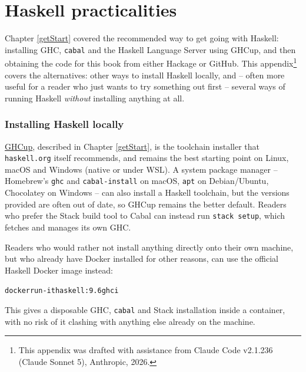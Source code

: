

\chapter{Haskell practicalities}
\label{OtherHS}

Chapter \ref{getStart} covered the recommended way to get going with Haskell: installing GHC, \texttt{cabal} and the Haskell Language Server using GHCup, and then obtaining the code for this book from either Hackage or GitHub. This appendix\footnote{This appendix was drafted with assistance from Claude Code v2.1.236 (Claude Sonnet 5), Anthropic, 2026.} covers the alternatives: other ways to install Haskell locally, and -- often more useful for a reader who just wants to try something out first -- several ways of running Haskell \emph{without} installing anything at all.

\subsection*{Installing Haskell locally}

\href{https://www.haskell.org/ghcup/}{GHCup}, described in Chapter \ref{getStart}, is the toolchain installer that \texttt{haskell.org} itself recommends, and remains the best starting point on Linux, macOS and Windows (native or under WSL). A system package manager -- Homebrew's \texttt{ghc} and \texttt{cabal-install} on macOS, \texttt{apt} on Debian/Ubuntu, Chocolatey on Windows -- can also install a Haskell toolchain, but the versions provided are often out of date, so GHCup remains the better default. Readers who prefer the Stack build tool to Cabal can instead run \texttt{stack setup}, which fetches and manages its own GHC.

Readers who would rather not install anything directly onto their own machine, but who already have Docker installed for other reasons, can use the official Haskell Docker image instead:
\begin{alltt}
docker run -it haskell:9.6 ghci
\end{alltt}
This gives a disposable GHC, \texttt{cabal} and Stack installation inside a container, with no risk of it clashing with anything else already on the machine.

